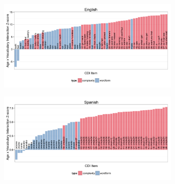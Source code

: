 \documentclass[10pt,letterpaper]{article}
\begin{document}
\begin{figure}[tb]
\centering

\begin{subfigure}[b]{0.45\textwidth}
\includegraphics[width=\textwidth]{plots/english_interactions}
\end{subfigure}
\begin{subfigure}[b]{0.45\textwidth}
\includegraphics[width=\textwidth]{plots/spanish_interactions}
\end{subfigure}


\end{figure}
\end{document}
